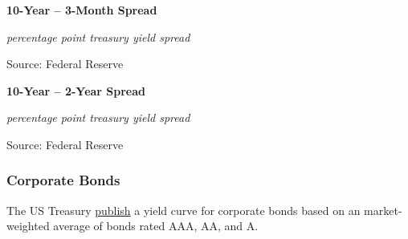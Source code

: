 \documentclass{report}
\makeatletter
\newcommand{\tbllink}[1]{\href{https://raw.githubusercontent.com/bdecon/US-chartbook/master/chartbook/data/#1}{\faTable}}
\newcommand*\short[1]{\expandafter\@gobbletwo\number\numexpr#1\relax}
\newcommand{\dateaxisticks}{
		date coordinates in=x, axis line style={draw=none},
		xmax={2020-10-01},
		max space between ticks=40,	    
		xtick={{1990-01-01}, {1992-01-01}, {1994-01-01}, 
			{1996-01-01}, {1998-01-01}, {2000-01-01}, 
			{2002-01-01}, {2004-01-01}, {2006-01-01},
			{2008-01-01}, {2010-01-01}, {2012-01-01}, {2014-01-01},
		    {2016-01-01}, {2018-01-01}, {2020-01-01}},
		minor xtick={{1989-01-01}, {1991-01-01}, {1993-01-01},
			{1995-01-01}, {1997-01-01}, {1999-01-01}, 
			{2001-01-01}, {2003-01-01}, {2005-01-01}, {2007-01-01},
		    {2009-01-01}, {2011-01-01}, {2013-01-01}, {2015-01-01},
		    {2017-01-01}, {2019-01-01}},
		enlarge y limits={0.06}, enlarge x limits={0.01},
		}
\newcommand{\bbar}[2]{extra #1 ticks = {{#2}}, extra #1 tick labels = ,
		extra #1 tick style = {grid=major, grid style={thick, black!25}},}
\newcommand{\thinline}[4]{\addplot[no markers, color=#1] 
		table [x=#2, y=#3, col sep=comma] {#4};	}
\makeatother
\begin{document}
{{{{{{{{{\begin{minipage}{0.76\textwidth}

\end{minipage}

\vspace{3mm}

\begin{minipage}{0.39\textwidth}

\normalsize \textbf{10-Year -- 3-Month Spread}

\footnotesize{\textit{percentage point treasury yield spread}}

\hspace*{-2mm} 

\footnotesize{Source: Federal Reserve} \hspace{20mm} \tbllink{spread.csv} 
\end{minipage}
\hspace{2mm}
\begin{minipage}{0.39\textwidth}
\normalsize \textbf{10-Year -- 2-Year Spread}

\footnotesize{\textit{percentage point treasury yield spread}}

\hspace*{-2mm} 

\footnotesize{Source: Federal Reserve} \hspace{20mm} \tbllink{spread.csv} 
\end{minipage}

\vspace{7mm}

\subsubsection*{\color{black!70} \seriffont Corporate Bonds}
\begin{minipage}{0.27\textwidth}
\small The US Treasury \href{https://www.treasury.gov/resource-center/economic-policy/corp-bond-yield/Pages/Corp-Yield-Bond-Curve-Papers.aspx}{publish} a yield curve for corporate bonds based on an market-weighted average of bonds rated AAA, AA, and A. 


\end{minipage}}}}}}}}}}
\end{document}

